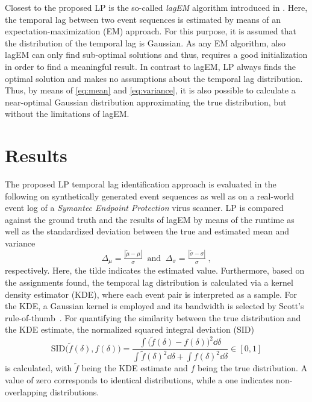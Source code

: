 \documentclass[journal, 10pt]{IEEEtran}
\begin{document}
Closest to the proposed LP is the so-called \emph{lagEM} algorithm introduced in \cite{Zeng2015}. Here, the temporal lag between two event sequences is estimated by means of an expectation-maximization (EM) approach. For this purpose, it is assumed that the distribution of the temporal lag is Gaussian. As any EM algorithm, also lagEM can only find sub-optimal solutions and thus, requires a good initialization in order to find a meaningful result. In contrast to lagEM, LP always finds the optimal solution and makes no assumptions about the temporal lag distribution. Thus, by means of \eqref{eq:mean} and \eqref{eq:variance}, it is also possible to calculate a near-optimal Gaussian distribution approximating the true distribution, but without the limitations of lagEM.


\section{Results}
\label{sec:results}
%
The proposed LP temporal lag identification approach is evaluated in the following on synthetically generated event sequences as well as on a real-world event log of a \emph{Symantec Endpoint Protection} virus scanner. LP is compared against the ground truth and the results of lagEM by means of the runtime as well as
the standardized deviation between the true and estimated mean and variance
%
\begin{equation}
	\Delta_\mu = \tfrac{|\tilde \mu - \mu|}{\sigma}~\text{ and }~\Delta_\sigma = \tfrac{|\tilde \sigma - \sigma|}{\sigma}~,
	\label{eq:std-deviation}
\end{equation}
%
respectively. Here, the tilde indicates the estimated value. 
Furthermore, based on the assignments found, the temporal lag distribution is calculated via a kernel density estimator (KDE), where each event pair is interpreted as a sample. For the KDE, a Gaussian kernel is employed and its bandwidth is selected by Scott's rule-of-thumb~\cite{Scott1992}. For quantifying the similarity between the true distribution and the KDE estimate, the normalized squared integral deviation (SID)~\cite{Fusion08_Huber_PGMR}
%
\begin{equation}
	\text{SID}\big(\tilde f(\delta), f(\delta)\big) = \frac{\int \big(\tilde f(\delta) - f(\delta)\big)^2 \dd \delta}{\int \tilde f(\delta)^2\dd \delta + \int f(\delta)^2 \dd \delta} \in [0,1]
\label{eq:}
\end{equation}
%
is calculated, with $\tilde f$ being the KDE estimate and $f$ being the true distribution. A value of zero corresponds to identical distributions, while a one indicates non-overlapping distributions.
\end{document}
